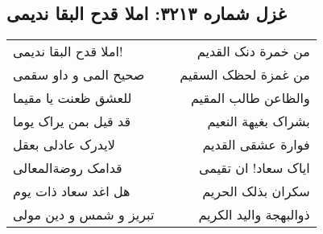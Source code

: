 \begin{center}
\section*{غزل شماره ۳۲۱۳: املا قدح البقا ندیمی}
\label{sec:3213}
\begin{longtable}{l p{0.5cm} r}
املا قدح البقا ندیمی!
&&
من خمرة دنک القدیم
\\
صحیح المی و داو سقمی
&&
من غمزة لحظک السقیم
\\
للعشق ظعنت یا مقیما
&&
والظاعن طالب المقیم
\\
قد قیل بمن یراک یوما
&&
بشراک بغیهة النعیم
\\
لایدرک عادلی بعقل
&&
فوارة عشقی القدیم
\\
قدامک روضةالمعالی
&&
ایاک سعاد! ان تقیمی
\\
هل اغد سعاد ذات یوم
&&
سکران بذلک الحریم
\\
تبریز و شمس و دین مولی
&&
ذوالبهجة والید الکریم
\\
\end{longtable}
\end{center}
